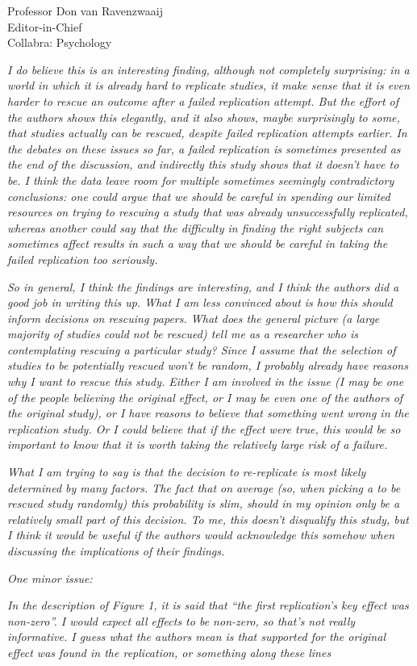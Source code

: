 \documentclass{stanfordletter}
\newcommand{\theysaid}[1]{\begin{leftbar} \noindent 
		\textsl{ #1}\end{leftbar}}
\begin{document}
\begin{letter}{Professor Don van Ravenzwaaij \\ Editor-in-Chief \\ Collabra: Psychology }
		\theysaid{I do believe this is an interesting finding, although not completely surprising: in a world in which it is already hard to replicate studies, it make sense that it is even harder to rescue an outcome after a failed replication attempt. But the effort of the authors shows this elegantly, and it also shows, maybe surprisingly to some, that studies actually can be rescued, despite failed replication attempts earlier. In the debates on these issues so far, a failed replication is sometimes presented as the end of the discussion, and indirectly this study shows that it doesn’t have to be. I think the data leave room for multiple sometimes seemingly contradictory conclusions: one could argue that we should be careful in spending our limited resources on trying to rescuing a study that was already unsuccessfully replicated, whereas another could say that the difficulty in finding the right subjects can sometimes affect results in such a way that we should be careful in taking the failed replication too seriously.}
		
		\theysaid{So in general, I think the findings are interesting, and I think the authors did a good job in writing this up. What I am less convinced about is how this should inform decisions on rescuing papers. What does the general picture (a large majority of studies could not be rescued) tell me as a researcher who is contemplating rescuing a particular study? Since I assume that the selection of studies to be potentially rescued won’t be random, I probably already have reasons why I want to rescue this study. Either I am involved in the issue (I may be one of the people believing the original effect, or I may be even one of the authors of the original study), or I have reasons to believe that something went wrong in the replication study. Or I could believe that if the effect were true, this would be so important to know that it is worth taking the relatively large risk of a failure.}
		
		\theysaid{What I am trying to say is that the decision to re-replicate is most likely determined by many factors. The fact that on average (so, when picking a to be rescued study randomly) this probability is slim, should in my opinion only be a relatively small part of this decision. To me, this doesn’t disqualify this study, but I think it would be useful if the authors would acknowledge this somehow when discussing the implications of their findings.}
		
		\theysaid{One minor issue:}
		\theysaid{In the description of Figure 1, it is said that “the first replication’s key effect was non-zero”. I would expect all effects to be non-zero, so that’s not really informative. I guess what the authors mean is that supported for the original effect was found in the replication, or something along these lines}
		

\end{letter}
\end{document}
